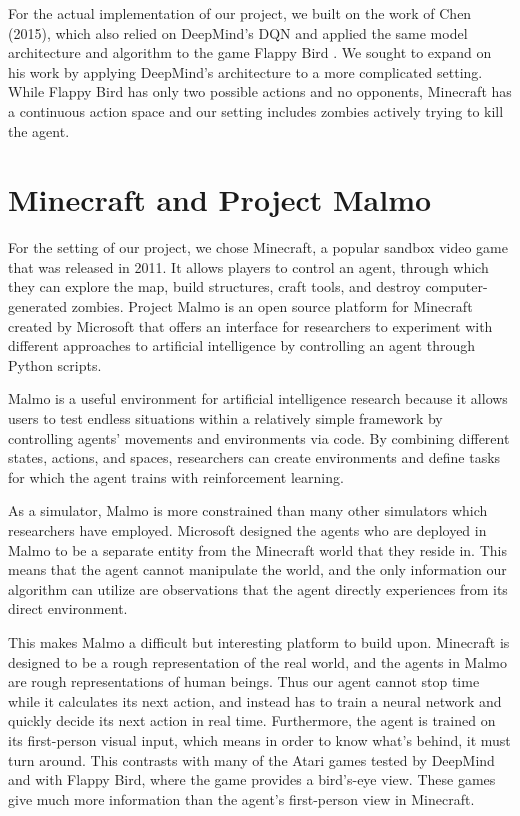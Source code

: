 \documentclass{article}
\begin{document}
\begin{multicols}{2}
For the actual implementation of our project, we built on the work of Chen (2015), which also relied on DeepMind's DQN and applied the same model architecture and algorithm to the game Flappy Bird \cite{flappyBird}.
We sought to expand on his work by applying DeepMind's architecture to a more complicated setting.
While Flappy Bird has only two possible actions and no opponents, Minecraft has a continuous action space and our setting includes zombies actively trying to kill the agent.




\section{Minecraft and Project Malmo}

For the setting of our project, we chose Minecraft, a popular sandbox video game that was released in 2011. It allows players to control an agent, through which they can explore the map, build structures, craft tools, and destroy computer-generated zombies.
Project Malmo is an open source platform for Minecraft created by Microsoft that offers an interface for researchers to experiment with different approaches to artificial intelligence by controlling an agent through Python scripts.

Malmo is a useful environment for artificial intelligence research because it allows users to test endless situations within a relatively simple framework by controlling agents' movements and environments via code. By combining different states, actions, and spaces, researchers can create environments and define tasks for which the agent trains with reinforcement learning.

As a simulator, Malmo is more constrained than many other simulators which researchers have employed. Microsoft designed the agents who are deployed in Malmo to be a separate entity from the Minecraft world that they reside in. This means that the agent cannot manipulate the world, and the only information our algorithm can utilize are observations that the agent directly experiences from its direct environment.

This makes Malmo a difficult but interesting platform to build upon. Minecraft is designed to be a rough representation of the real world, and the agents in Malmo are rough representations of human beings. Thus our agent cannot stop time while it calculates its next action, and instead has to train a neural network and quickly decide its next action in real time. Furthermore, the agent is trained on its first-person visual input, which means in order to know what's behind, it must turn around. This contrasts with many of the Atari games tested by DeepMind and with Flappy Bird, where the game provides a bird's-eye view. These games give much more information than the agent's first-person view in Minecraft.





\end{multicols}
\end{document}
